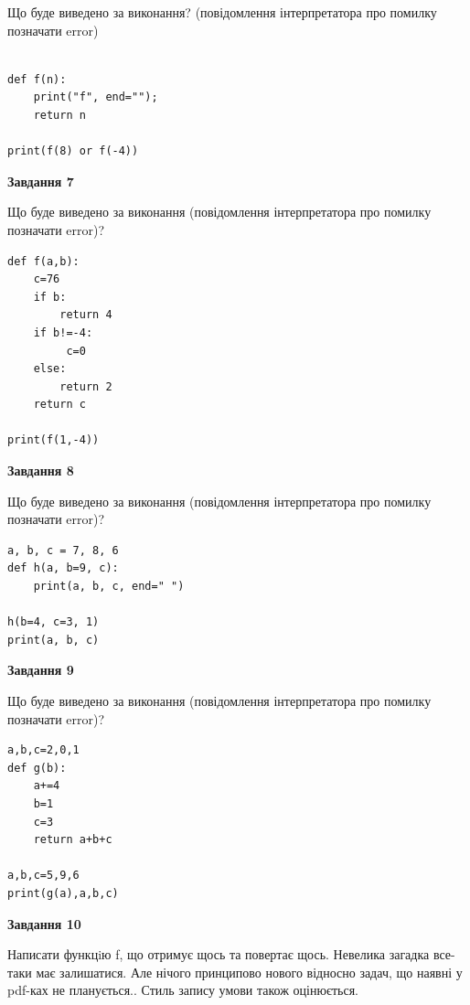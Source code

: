 \documentclass[12pt, ukrainian]{article}
\begin{document}
{\begin {large}
Що буде виведено за виконання? (повідомлення інтерпретатора про помилку позначати error)\par
\begin{verbatim}

def f(n):
    print("f", end="");
    return n

print(f(8) or f(-4))
\end{verbatim}

{\begin {center}\textbf{Завдання 7}\end {center}}

Що буде виведено за виконання (повідомлення інтерпретатора про помилку позначати error)?\par
\begin{verbatim}
def f(a,b):
    c=76
    if b:
        return 4
    if b!=-4:
         c=0
    else: 
        return 2
    return c

print(f(1,-4))
\end{verbatim}

{\begin {center}\textbf{Завдання 8}\end {center}}

Що буде виведено за виконання (повідомлення інтерпретатора про помилку позначати error)?\par
\begin{verbatim}
a, b, c = 7, 8, 6
def h(a, b=9, c):
    print(a, b, c, end=" ")

h(b=4, c=3, 1)
print(a, b, c)
\end{verbatim}

{\begin {center}\textbf{Завдання 9}\end {center}}

Що буде виведено за виконання (повідомлення інтерпретатора про помилку позначати error)?\par
\begin{verbatim}
a,b,c=2,0,1
def g(b):
    a+=4
    b=1
    c=3
    return a+b+c

a,b,c=5,9,6
print(g(a),a,b,c)
\end{verbatim}

{\begin {center}\textbf{Завдання 10}\end {center}}


Написати функцiю f, що отримує щось та повертає щось. Невелика загадка все-таки має залишатися. Але нічого принципово нового відносно задач, що наявні у pdf-ках не планується.. Стиль запису умови також оцінюється.\par
\end {large}}
\newpage
\end{document}
